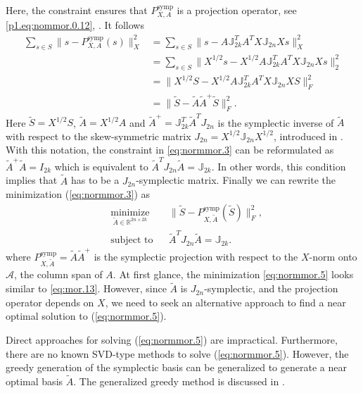 Here, the constraint ensures that $P_{X,A}^{\text{symp}}$ is a projection operator, see \eqref{p1.eq:nommor.0.12}, . It follows
\begin{equation} \label{eq:normmor.4}
\begin{aligned}
	\sum_{s\in S} \| s - P_{X,A}^{\text{symp}}(s) \|_X^2 &= \sum_{s\in S} \| s - A \mathbb J_{2k}^T A^T X \mathbb J_{2n} Xs \|_X^2 \\
	&= \sum_{s\in S} \| X^{1/2}s - X^{1/2} A \mathbb J_{2k}^T A^T X \mathbb J_{2n} X s \|_2^2 \\
	&= \| X^{1/2} S - X^{1/2} A \mathbb J_{2k}^T A^T X \mathbb J_{2n} X S \|_F^2 \\
	&= \| \tilde S - \tilde A \tilde A ^+ \tilde S \|_F^2.
\end{aligned}
\end{equation}
Here $\tilde S = X^{1/2} S$, $\tilde A = X^{1/2} A$ and $\tilde A^+ = \mathbb J_{2k}^T \tilde A^T J_{2n}$ is the symplectic inverse of $\tilde A$ with respect to the skew-symmetric matrix $J_{2n} = X^{1/2} \mathbb J_{2n} X^{1/2}$, introduced in . With this notation, the constraint in \eqref{eq:normmor.3} can be reformulated as $\tilde A ^+ \tilde A = I_{2k}$ which is equivalent to $\tilde A ^T J_{2n} \tilde A = \mathbb J_{2k}$. In other words, this condition implies that $\tilde A$ has to be a $J_{2n}$-symplectic matrix. Finally we can rewrite the minimization (\ref{eq:normmor.3}) as
\begin{equation} \label{eq:normmor.5}
\begin{aligned}
& \underset{\tilde A\in \mathbb{R}^{2n\times 2k}}{\text{minimize}}
& & \| \tilde S - P^\text{symp}_{X,\tilde A}(\tilde S) \|_F^2, \\
& \text{subject to}
& & \tilde A^T J_{2n} \tilde A = \mathbb J_{2k}.
\end{aligned}
\end{equation}
where $P^\text{symp}_{X,\tilde A} = \tilde A \tilde A^+$ is the symplectic projection with respect to the $X$-norm onto $\mathcal A$, the column span of $A$. At first glance, the minimization \eqref{eq:normmor.5} looks similar to \eqref{eq:mor.13}. However, since $\tilde A$ is $J_{2n}$-symplectic, and the projection operator depends on $X$, we need to seek an alternative approach to find a near optimal solution to (\ref{eq:normmor.5}). 

Direct approaches for solving (\ref{eq:normmor.5}) are impractical. Furthermore, there are no known SVD-type methods to solve (\ref{eq:normmor.5}). However, the greedy generation of the symplectic basis can be generalized to generate a near optimal basis $\tilde A$. The generalized greedy method is discussed in .

